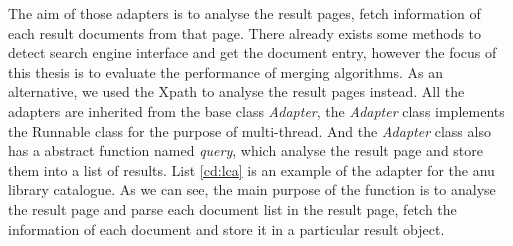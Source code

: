 The aim of those adapters is to analyse the result pages, fetch information of each result documents from that page. There already exists some methods to detect search engine interface and get the document entry, however the focus of this thesis is to evaluate the performance of merging algorithms. As an alternative, we used the Xpath to analyse the result pages instead. All the adapters are inherited from the base class \textit{Adapter}, the \textit{Adapter} class implements the Runnable class for the purpose of multi-thread. And the \textit{Adapter} class also has a abstract function named \textit{query}, which analyse the result page and store them into a list of results. List \ref{cd:lca} is an example of the adapter for the anu library catalogue. As we can see, the main purpose of the function is to analyse the result page and parse each document list in the result page, fetch the information of each document and store it in a particular result object.
\lstset{escapechar=@,style=customc}
